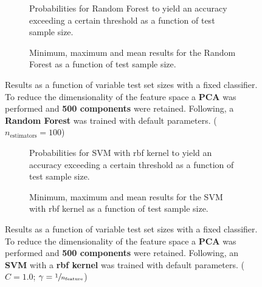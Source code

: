 \begin{figure}
    \captionsetup[subfigure]{justification=justified,singlelinecheck=false}
    \begin{subfigure}[t]{0.61\textwidth}
        
        \caption{Probabilities for Random Forest to yield an accuracy exceeding a certain threshold as a function of test sample size.}
    \end{subfigure}
    \hspace{3.0mm}
    \begin{subfigure}[t]{0.34\textwidth}
        
        \caption{Minimum, maximum and mean results for the Random Forest as a function of test sample size.}
    \end{subfigure}
    \caption[Effects of varying test sample size. Random Forest; Preprocessing: PCA ($n_\text{components} = \num{500}$)]{Results as a function of variable test set sizes with a fixed classifier. To reduce the dimensionality of the feature space a \textbf{PCA} was performed and \textbf{\num{500} components} were retained. Following, a \textbf{{Random Forest}} was trained with default parameters. ($n_\text{estimators}=\num{100}$)}
    \label{fig:PCA_500_components_no_selection_RandomForest}
\end{figure}

\begin{figure}
    \captionsetup[subfigure]{justification=justified,singlelinecheck=false}
    \begin{subfigure}[t]{0.61\textwidth}
        
        \caption{Probabilities for SVM with rbf kernel to yield an accuracy exceeding a certain threshold as a function of test sample size.}
    \end{subfigure}
    \hspace{3.0mm}
    \begin{subfigure}[t]{0.34\textwidth}
        
        \caption{Minimum, maximum and mean results for the SVM with rbf kernel as a function of test sample size.}
    \end{subfigure}
    \caption[Effects of varying test sample size. SVM (kernel = rbf); Preprocessing: PCA ($n_\text{components} = \num{500}$)]{Results as a function of variable test set sizes with a fixed classifier. To reduce the dimensionality of the feature space a \textbf{PCA} was performed and \textbf{\num{500} components} were retained. Following, an \textbf{{SVM}} with a \textbf{{rbf kernel}} was trained with default parameters. ($C=\num{1.0}$; $\gamma=\sfrac{1}{n_\text{feature}}$)}
    \label{fig:PCA_500_components_no_selection_SVC}
\end{figure}

